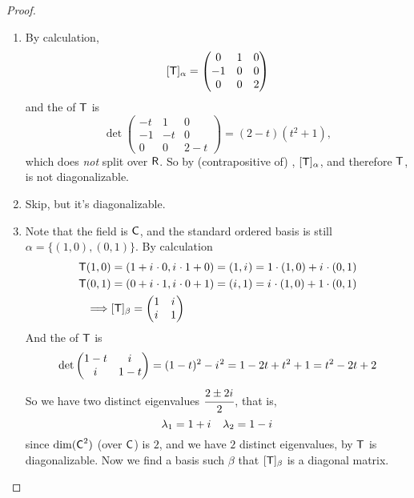 \begin{proof}
\begin{enumerate}
\item
By calculation,
\[
    [\textsf{T}]_{\alpha} = \begin{pmatrix}
        0 & 1 & 0 \\
        -1 & 0 & 0 \\
        0 & 0 & 2
    \end{pmatrix}
\]
and the \CPOLY{} of \(\textsf{T}\) is
\[
    \det \begin{pmatrix}
        -t & 1 & 0 \\
        -1 & -t & 0 \\
        0 & 0 & 2-t
    \end{pmatrix} = (2 - t)(t^2 + 1),
\]
which does \emph{not} split over \(\textsf{R}\).
So by (contrapositive of) , \([\textsf{T}]_{\alpha}\), and therefore \(\textsf{T}\), is not diagonalizable.

\item Skip, but it's diagonalizable.

\item Note that the field is \(\textsf{C}\), and the standard ordered basis is still \(\alpha = \{(1, 0), (0, 1)\}\).
By calculation
\begin{align*}
    \textsf{T}(1, 0) & = (1 + {i\mkern1mu} \cdot 0, {i\mkern1mu} \cdot 1 + 0) = (1, {i\mkern1mu}) = 1 \cdot (1, 0) + {i\mkern1mu} \cdot (0, 1) \\
    \textsf{T}(0, 1) & = (0 + {i\mkern1mu} \cdot 1, {i\mkern1mu} \cdot 0 + 1) = ({i\mkern1mu}, 1) = {i\mkern1mu} \cdot (1, 0) + 1 \cdot (0, 1) \\
    \implies & [\textsf{T}]_{\beta} = \begin{pmatrix} 1 & {i\mkern1mu} \\ {i\mkern1mu} & 1 \end{pmatrix}
\end{align*}
And the \CPOLY{} of \(\textsf{T}\) is
\[
    \det \begin{pmatrix} 1 - t & {i\mkern1mu} \\ {i\mkern1mu} & 1 - t \end{pmatrix}
    = (1 - t)^2 - {i\mkern1mu}^2 = 1 - 2t + t^2 + 1 = t^2 - 2t + 2
\]
So we have two distinct eigenvalues \(\cfrac{2 \pm 2 {i\mkern1mu}}{2}\), that is,
\[
    \lambda_1 = 1 + {i\mkern1mu} \quad \lambda_2 = 1 - {i\mkern1mu}
\]
since \(\dim(\textsf{C}^2)\) (over \(\textsf{C}\)) is \(2\), and we have \(2\) distinct eigenvalues, by  \(\textsf{T}\) is diagonalizable.
Now we find a basis such \(\beta\) that \([\textsf{T}]_{\beta}\) is a diagonal matrix.


\end{enumerate}
\end{proof}
